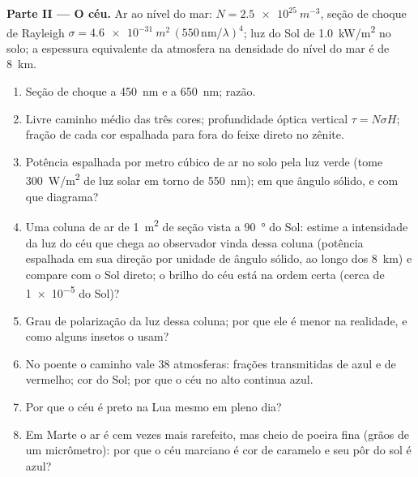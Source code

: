 \begin{problem}
\medskip
\noindent\textbf{Parte II --- O céu.}
Ar ao nível do mar: $N = \qty{2.5e25}{m^{-3}}$, seção de choque de Rayleigh $\sigma =
\qty{4.6e-31}{m^2}\,(550\,\text{nm}/\lambda)^4$; luz do Sol de \qty{1.0}{kW/m^2} no
solo; a espessura equivalente da atmosfera na densidade do nível do mar é de
\qty{8}{km}.
\begin{enumerate}[resume]
  \item Seção de choque a \qty{450}{nm} e a \qty{650}{nm}; razão.
  \item Livre caminho médio das três cores; profundidade óptica vertical
        $\tau = N\sigma H$; fração de cada cor espalhada para fora do
        feixe direto no zênite.
  \item Potência espalhada por metro cúbico de ar no solo pela
        luz verde (tome \qty{300}{W/m^2} de luz solar em torno de
        \qty{550}{nm}); em que ângulo sólido, e com que diagrama?
  \item Uma coluna de ar de \qty{1}{m^2} de seção vista a \qty{90}{\degree} do
        Sol: estime a intensidade da luz do céu que chega ao
        observador vinda dessa coluna (potência espalhada em sua direção por
        unidade de ângulo sólido, ao longo dos \qty{8}{km}) e compare com o
        Sol direto; o brilho do céu está na ordem certa
        (cerca de \qty{1e-5}{} do Sol)?
  \item Grau de polarização da luz dessa coluna; por que ele é
        menor na realidade, e como alguns insetos o usam?
  \item No poente o caminho vale $38$ atmosferas: frações transmitidas
        de azul e de vermelho; cor do Sol; por que o céu no alto continua
        azul.
  \item Por que o céu é preto na Lua mesmo em pleno dia?
  \item Em Marte o ar é cem vezes mais rarefeito, mas cheio de poeira
        fina (grãos de um micrômetro): por que o céu marciano é
        cor de caramelo e seu pôr do sol é azul?
\end{enumerate}


\end{problem}
